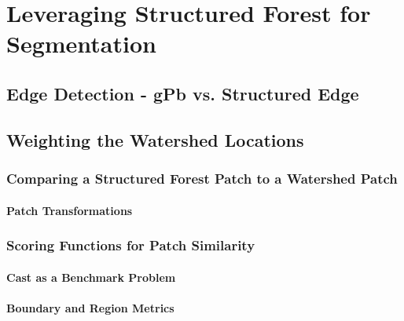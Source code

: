 \chapter{Leveraging Structured Forest for Segmentation}
\label{Chapter4}
\section{Edge Detection - gPb vs. Structured Edge}
\section{Weighting the Watershed Locations}
\subsection{Comparing a Structured Forest Patch to a Watershed Patch}
\subsubsection{Patch Transformations}
\subsection{Scoring Functions for Patch Similarity}
\subsubsection{Cast as a Benchmark Problem}
\subsubsection{Boundary and Region Metrics}
